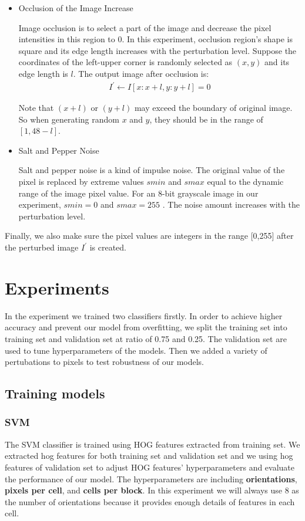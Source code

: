 \documentclass{article}
\begin{document}
\begin{itemize}
    \item Occlusion of the Image Increase
    
    Image occlusion is to select a part of the image and decrease the pixel intensities in this region to 0. In this experiment, occlusion region's shape is square and its edge length increases with the perturbation level. Suppose the coordinates of the left-upper corner is randomly selected as $(x, y)$ and its edge length is $l$. The output image after occlusion is:
    \begin{align*}
    I^{'} \leftarrow I[x:x+l,y:y+l] = 0
    \end{align*}
    
    Note that $(x+l)$ or $(y+l)$ may exceed the boundary of original image. So when generating random $x$ and $y$, they should be in the range of $[1, 48-l]$.
    
    \item Salt and Pepper Noise
    
    Salt and pepper noise is a kind of impulse noise. The original value of the pixel is replaced by extreme values $smin$ and $smax$ equal to the dynamic range of the image pixel value. For an 8-bit grayscale image in our experiment, $smin=0$ and $smax=255$ \cite{leavline2013salt}. The noise amount increases with the perturbation level.

\end{itemize}

Finally, we also make sure the pixel values are integers in the range [0,255] after the perturbed image $I^{'}$ is created.

\section{Experiments}
\label{sec:expts}

In the experiment we trained two classifiers firstly. In order to achieve higher accuracy and prevent our model from overfitting, we split the training set into training set and validation set at ratio of 0.75 and 0.25. The validation set are used to tune hyperparameters of the models. Then we added a variety of pertubations to pixels to test robustness of our models.

\subsection{Training models}

\subsubsection{SVM}
 The SVM classifier is trained using HOG features extracted from training set. We extracted hog features for both training set and validation set and we using hog features of validation set to adjust HOG features' hyperparameters and evaluate the performance of our model. The hyperparameters are including \textbf{orientations}, \textbf{pixels per cell}, and \textbf{cells per block}. In this experiment we will always use 8 as the number of orientations because it provides enough details of features in each cell. 
 
\end{document}
